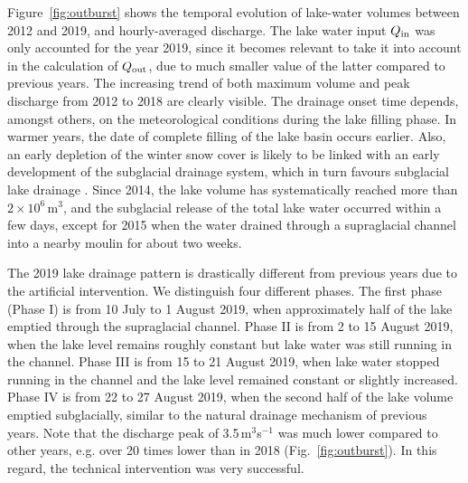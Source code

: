 Figure~\ref{fig:outburst} shows the temporal evolution of lake-water volumes between 2012 and 2019, and hourly-averaged discharge. The lake water input $Q_{\rm in}$ was only accounted for the year 2019, since it becomes relevant to take it into account in the calculation of $Q_{\rm out}$, due to much smaller value of the latter compared to previous years.
The increasing trend of both maximum volume and peak discharge from 2012 to 2018 are clearly visible. The drainage onset time depends, amongst others, on the meteorological conditions during the lake filling phase. In warmer years, the date of complete filling of the lake basin occurs earlier. Also, an early depletion of the winter snow cover is likely to be linked with an early development of the subglacial drainage system, which in turn favours subglacial lake drainage \citep{GlaciologicalReport2018}.  Since 2014, the lake volume has systematically reached more than $2\times10^6$\,m$^3$, and the subglacial release of the total lake water occurred within a few days, except for 2015 when the water drained through a supraglacial channel into a nearby moulin for about two weeks.

The 2019 lake drainage pattern is drastically different from previous years due to the artificial intervention. We distinguish four different phases. The first phase (Phase I) is from 10 July to 1 August 2019, when approximately half of the lake emptied through the supraglacial channel. Phase II is from 2 to 15 August 2019, when the lake level remains roughly constant but  lake water was still running in the channel. Phase III is from 15 to 21 August 2019, when lake water stopped running in the channel and the lake level remained constant or slightly increased. Phase IV is from 22 to 27 August 2019, when the second half of the lake volume emptied subglacially, similar to the natural drainage mechanism of previous years. Note that the discharge peak of 3.5\,m$^3$s$^{-1}$ was much lower compared to other years, e.g. over 20 times lower than in 2018 (Fig.~\ref{fig:outburst}). In this regard, the technical intervention was very successful.

